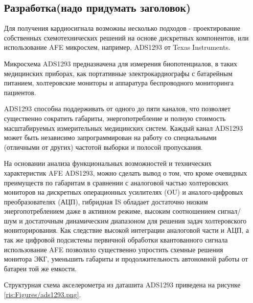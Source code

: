 \subsection{Разработка(надо придумать заголовок)}

Для получения кардиосигнала возможны несколько подходов - проектирование собственных схемотехнических решений на основе дискретных компонентов, или использование \acf{AFE} микросхем, например, ADS1293  от Texas Instruments.

Микросхема ADS1293 предназначена для измерения биопотенциалов, в таких медицинских приборах, как портативные электрокардиографы с батарейным питанием, холтеровские мониторы и аппаратура беспроводного мониторинга пациентов. \cite{ADS1293}

ADS1293 способна поддерживать от одного до пяти каналов, что позволяет существенно сократить габариты, энергопотребление и полную стоимость масштабируемых измерительных медицинских систем. Каждый канал ADS1293 может быть независимо запрограммирован на работу со специальными (отличными от других) частотой выборки и полосой пропускания. 

На основании анализа функциональных возможностей и технических характеристик \ac{AFE} ADS1293, можно сделать вывод о том, что кроме очевидных преимуществ по габаритам в сравнении с аналоговой частью холтеровских мониторов на дискретных операционных усилителях (\acs{OU}) и аналого-цифровых преобразователях (\acs{АЦП}), гибридная \ac{IS} обладает достаточно низким энергопотреблением даже в активном режиме, высоким соотношением сигнал/шум и достаточным динамическим диапазоном для решения задач холтеровского мониторирования. Как следствие высокой интеграции аналоговой части и \ac{АЦП}, а так же цифровой подсистемы первичной обработки квантованного сигнала использование \ac{AFE} позволило существенно упростить схемные решения монитора \acs{ЭКГ}, уменьшить габариты и продолжительность автономной работы от батареи той же емкости. 




















Структурная схема акселерометра из даташита ADS1293 \cite{DS1293} приведена на рисунке \ref{ris:Figures/ads1293.png}.


